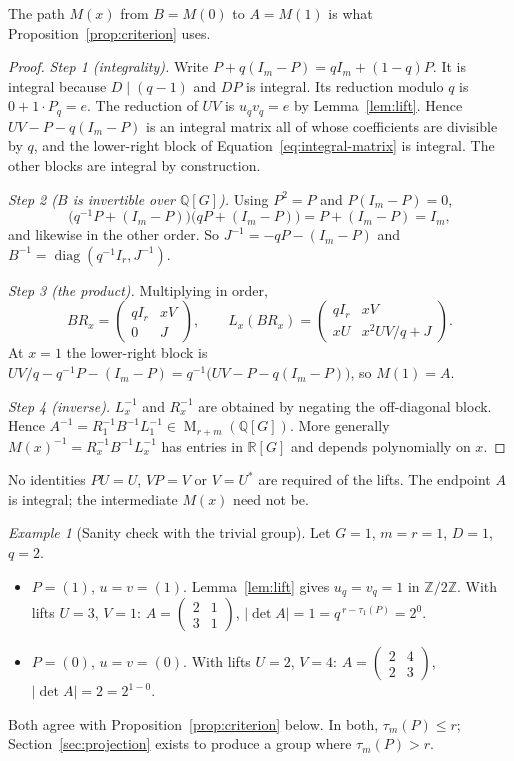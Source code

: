 \documentclass[11pt]{article}
\theoremstyle{remark}
\newtheorem{example}[theorem]{Example}
\numberwithin{equation}{section}
\newcommand{\Z}{\mathbb Z}
\newcommand{\Q}{\mathbb Q}
\newcommand{\R}{\mathbb R}
\newcommand{\Mat}{\operatorname{M}}
\newcommand{\diag}{\operatorname{diag}}
\begin{document}
The path $M(x)$ from $B=M(0)$ to $A=M(1)$ is what Proposition~\ref{prop:criterion} uses.

\begin{proof}
\emph{Step 1 (integrality).} Write $P+q(I_m-P)=qI_m+(1-q)P$. It is integral because $D\mid(q-1)$ and $DP$ is integral. Its reduction modulo $q$ is $0+1\cdot P_q=e$. The reduction of $UV$ is $u_qv_q=e$ by Lemma~\ref{lem:lift}. Hence $UV-P-q(I_m-P)$ is an integral matrix all of whose coefficients are divisible by $q$, and the lower-right block of Equation~\eqref{eq:integral-matrix} is integral. The other blocks are integral by construction.

\emph{Step 2 ($B$ is invertible over $\Q[G]$).} Using $P^2=P$ and $P(I_m-P)=0$,
\[
 \bigl(q^{-1}P+(I_m-P)\bigr)\bigl(qP+(I_m-P)\bigr)=P+(I_m-P)=I_m,
\]
and likewise in the other order. So $J^{-1}=-qP-(I_m-P)$ and $B^{-1}=\diag(q^{-1}I_r,J^{-1})$.

\emph{Step 3 (the product).} Multiplying in order,
\[
 BR_x=\begin{pmatrix}qI_r&xV\\0&J\end{pmatrix},\qquad
 L_x(BR_x)=\begin{pmatrix}qI_r&xV\\xU&x^2UV/q+J\end{pmatrix}.
\]
At $x=1$ the lower-right block is $UV/q-q^{-1}P-(I_m-P)=q^{-1}\bigl(UV-P-q(I_m-P)\bigr)$, so $M(1)=A$.

\emph{Step 4 (inverse).} $L_x^{-1}$ and $R_x^{-1}$ are obtained by negating the off-diagonal block. Hence $A^{-1}=R_1^{-1}B^{-1}L_1^{-1}\in\Mat_{r+m}(\Q[G])$. More generally $M(x)^{-1}=R_x^{-1}B^{-1}L_x^{-1}$ has entries in $\R[G]$ and depends polynomially on $x$.
\end{proof}

No identities $PU=U$, $VP=V$ or $V=U^*$ are required of the lifts. The endpoint $A$ is integral; the intermediate $M(x)$ need not be.

\begin{example}[Sanity check with the trivial group]\label{ex:sanity}
Let $G=1$, $m=r=1$, $D=1$, $q=2$.
\begin{itemize}[leftmargin=2em]
\item $P=(1)$, $u=v=(1)$. Lemma~\ref{lem:lift} gives $u_q=v_q=1$ in $\Z/2\Z$. With lifts $U=3$, $V=1$: $A=\begin{pmatrix}2&1\\3&1\end{pmatrix}$, $|\det A|=1=q^{\,r-\tau_1(P)}=2^{0}$.
\item $P=(0)$, $u=v=(0)$. With lifts $U=2$, $V=4$: $A=\begin{pmatrix}2&4\\2&3\end{pmatrix}$, $|\det A|=2=2^{1-0}$.
\end{itemize}
Both agree with Proposition~\ref{prop:criterion} below. In both, $\tau_m(P)\le r$; Section~\ref{sec:projection} exists to produce a group where $\tau_m(P)>r$.
\end{example}
\end{document}
